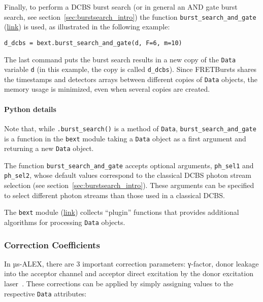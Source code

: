 Finally, to perform a DCBS burst search (or in general an AND gate burst search,
see section~\ref{sec:burstsearch_intro}) the function
\verb|burst_search_and_gate|
(\href{http://fretbursts.readthedocs.org/en/latest/plugins.html#fretbursts.burstlib_ext.burst_search_and_gate}{link})
is used, as illustrated in the following example:

\begin{lstlisting}
d_dcbs = bext.burst_search_and_gate(d, F=6, m=10)
\end{lstlisting}

The last command puts the burst search results in a new copy of the \verb|Data| variable \verb|d|
(in this example, the copy is called \verb|d_dcbs|).
Since FRETBursts shares the timestamps and detectors arrays between
different copies of \verb|Data| objects, the memory usage is minimized, even when 
several copies are created. 

\paragraph{Python details}
Note that, while \verb|.burst_search()| is a method of \verb|Data|,
\verb|burst_search_and_gate| is a function in the \verb|bext| module
taking a \verb|Data| object as a first argument and returning a new
\verb|Data| object.

The function \verb|burst_search_and_gate| accepts optional arguments,
\verb|ph_sel1| and \verb|ph_sel2|, whose default values correspond to the
classical DCBS photon stream selection (see section~\ref{sec:burstsearch_intro}).
These arguments can be specified to select different photon streams than those used in
a classical DCBS.

The \verb|bext| module (\href{http://fretbursts.readthedocs.org/en/latest/plugins.html}{link}) 
collects ``plugin'' functions that provides additional algorithms 
for processing \verb|Data| objects. 

\subsubsection{Correction Coefficients}
\label{sec:corrcoeff}

In µs-ALEX, there are 3 important correction parameters: γ-factor, donor leakage into the acceptor channel
and acceptor direct excitation by the donor excitation laser~\cite{Lee_2005}.
These corrections can be applied by simply assigning values to the respective \verb|Data| attributes:

